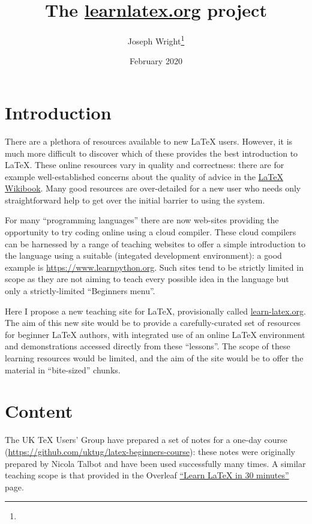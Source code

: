 \documentclass{article}
\author{Joseph Wright\thanks{\email{joseph.wright@morningstar2.co.uk}}}
\date{February 2020}
\title{The \url{learnlatex.org} project}
\begin{document}
\maketitle

\section{Introduction}

There are a plethora of resources available to new \LaTeX{} users. However, it
is much more difficult to discover which of these provides the best
introduction to \LaTeX{}. These online resources vary in quality and
correctness: there are for example well-established concerns about the quality
of advice in the \href{https://en.wikibooks.org/wiki/LaTeX}{\LaTeX{} Wikibook}.
Many good resources are over-detailed for a new user who needs only
straightforward help to get over the initial barrier to using the system.

For many \enquote{programming languages} there are now web-sites providing the
opportunity to try coding online using a cloud compiler. These cloud compilers
can be harnessed by a range of teaching websites to offer a simple introduction
to the language using a suitable  (integated development
environment): a good example is \url{https://www.learnpython.org}. Such sites
tend to be strictly limited in scope as they are not aiming to teach every
possible idea in the language but only a strictly-limited \enquote{Beginners
menu}.

Here I propose a new teaching site for \LaTeX{}, provisionally called
\url{learn-latex.org}. The aim of this new site would be to provide a
carefully-curated set of resources for beginner \LaTeX{} authors, with
integrated use of an online \LaTeX{} environment and demonstrations accessed
directly from these \enquote{lessons}. The scope of these learning resources
would be limited, and the aim of the site would be to offer the material in
\enquote{bite-sized} chunks.

\section{Content}

The UK \TeX{} Users' Group have prepared a set of notes for a one-day course
(\url{https://github.com/uktug/latex-beginners-course}): these notes were
originally prepared by Nicola Talbot and have been used successfully many
times. A similar teaching scope is that provided in the Overleaf
\href{https://www.overleaf.com/learn/latex/Learn_LaTeX_in_30_minutes}{\enquote{Learn
\LaTeX{} in 30 minutes}} page.
\end{document}
